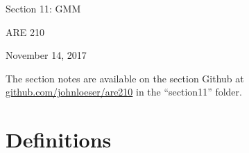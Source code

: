 \documentclass[12pt,english]{article}
\begin{document}
\begin{center}
{\Large{}Section 11: GMM}
\par\end{center}{\Large \par}

\begin{center}
ARE 210
\par\end{center}

\begin{center}
November 14, 2017
\par\end{center}

The section notes are available on the section Github at \href{github.com/johnloeser/are210}{github.com/johnloeser/are210} in the ``section11'' folder.

\section{Definitions}
\end{document}
